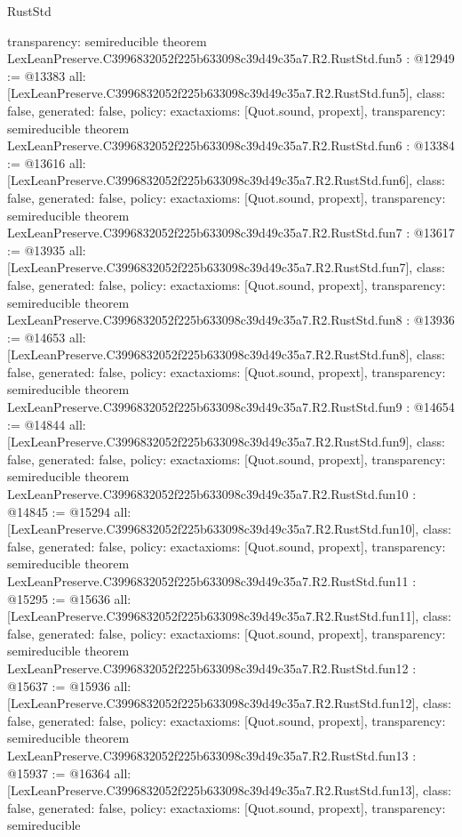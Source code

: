 \begin{lexlean}{RustStd}
\begin{coremodule}
{  transparency: semireducible
}
theorem LexLeanPreserve.C3996832052f225b633098c39d49c35a7.R2.RustStd.fun5 : @12949 := @13383 {
  all: [LexLeanPreserve.C3996832052f225b633098c39d49c35a7.R2.RustStd.fun5],
  class: false,
  generated: false,
  policy: exact{axioms: [Quot.sound, propext]},
  transparency: semireducible
}
theorem LexLeanPreserve.C3996832052f225b633098c39d49c35a7.R2.RustStd.fun6 : @13384 := @13616 {
  all: [LexLeanPreserve.C3996832052f225b633098c39d49c35a7.R2.RustStd.fun6],
  class: false,
  generated: false,
  policy: exact{axioms: [Quot.sound, propext]},
  transparency: semireducible
}
theorem LexLeanPreserve.C3996832052f225b633098c39d49c35a7.R2.RustStd.fun7 : @13617 := @13935 {
  all: [LexLeanPreserve.C3996832052f225b633098c39d49c35a7.R2.RustStd.fun7],
  class: false,
  generated: false,
  policy: exact{axioms: [Quot.sound, propext]},
  transparency: semireducible
}
theorem LexLeanPreserve.C3996832052f225b633098c39d49c35a7.R2.RustStd.fun8 : @13936 := @14653 {
  all: [LexLeanPreserve.C3996832052f225b633098c39d49c35a7.R2.RustStd.fun8],
  class: false,
  generated: false,
  policy: exact{axioms: [Quot.sound, propext]},
  transparency: semireducible
}
theorem LexLeanPreserve.C3996832052f225b633098c39d49c35a7.R2.RustStd.fun9 : @14654 := @14844 {
  all: [LexLeanPreserve.C3996832052f225b633098c39d49c35a7.R2.RustStd.fun9],
  class: false,
  generated: false,
  policy: exact{axioms: [Quot.sound, propext]},
  transparency: semireducible
}
theorem LexLeanPreserve.C3996832052f225b633098c39d49c35a7.R2.RustStd.fun10 : @14845 := @15294 {
  all: [LexLeanPreserve.C3996832052f225b633098c39d49c35a7.R2.RustStd.fun10],
  class: false,
  generated: false,
  policy: exact{axioms: [Quot.sound, propext]},
  transparency: semireducible
}
theorem LexLeanPreserve.C3996832052f225b633098c39d49c35a7.R2.RustStd.fun11 : @15295 := @15636 {
  all: [LexLeanPreserve.C3996832052f225b633098c39d49c35a7.R2.RustStd.fun11],
  class: false,
  generated: false,
  policy: exact{axioms: [Quot.sound, propext]},
  transparency: semireducible
}
theorem LexLeanPreserve.C3996832052f225b633098c39d49c35a7.R2.RustStd.fun12 : @15637 := @15936 {
  all: [LexLeanPreserve.C3996832052f225b633098c39d49c35a7.R2.RustStd.fun12],
  class: false,
  generated: false,
  policy: exact{axioms: [Quot.sound, propext]},
  transparency: semireducible
}
theorem LexLeanPreserve.C3996832052f225b633098c39d49c35a7.R2.RustStd.fun13 : @15937 := @16364 {
  all: [LexLeanPreserve.C3996832052f225b633098c39d49c35a7.R2.RustStd.fun13],
  class: false,
  generated: false,
  policy: exact{axioms: [Quot.sound, propext]},
  transparency: semireducible
}
\end{coremodule}
\end{lexlean}
